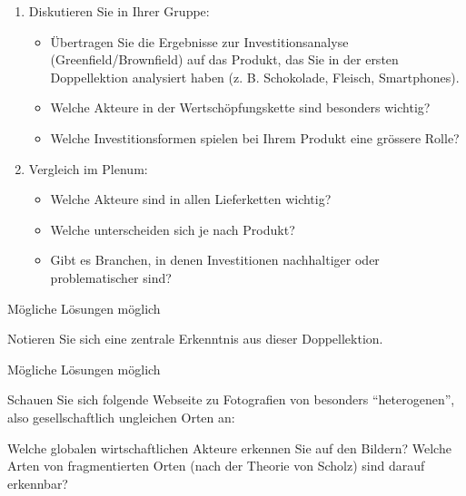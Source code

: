 \begin{myexercise}
    \begin{enumerate}
        \item Diskutieren Sie in Ihrer Gruppe:
              \begin{itemize}
                  \item Übertragen Sie die Ergebnisse zur Investitionsanalyse (Greenfield/Brownfield) auf das Produkt, das Sie in der ersten Doppellektion analysiert haben (z. B. Schokolade, Fleisch, Smartphones).
                  \item Welche Akteure in der Wertschöpfungskette sind besonders wichtig?
                  \item Welche Investitionsformen spielen bei Ihrem Produkt eine grössere Rolle?
              \end{itemize}
        \item Vergleich im Plenum:
              \begin{itemize}
                  \item Welche Akteure sind in allen Lieferketten wichtig?
                  \item Welche unterscheiden sich je nach Produkt?
                  \item Gibt es Branchen, in denen Investitionen nachhaltiger oder problematischer sind?
              \end{itemize}
    \end{enumerate}
    \begin{myanswer}
        Mögliche Lösungen möglich
    \end{myanswer}
\end{myexercise}
\begin{myexercise}
    Notieren Sie sich eine zentrale Erkenntnis aus dieser Doppellektion.

    \begin{myanswer}
        Mögliche Lösungen möglich
    \end{myanswer}
\end{myexercise}

\begin{mychallenge}
    Schauen Sie sich folgende Webseite zu Fotografien von besonders \enquote{heterogenen}, also gesellschaftlich ungleichen Orten an:


    Welche globalen wirtschaftlichen Akteure erkennen Sie auf den Bildern? Welche Arten von fragmentierten Orten (nach der Theorie von Scholz) sind darauf erkennbar?
\end{mychallenge}


